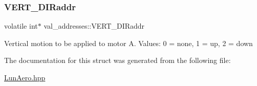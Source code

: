 \subsubsection{\texorpdfstring{V\+E\+R\+T\+\_\+\+D\+I\+Raddr}{VERT\_DIRaddr}}
{\footnotesize\ttfamily volatile int$\ast$ val\+\_\+addresses\+::\+V\+E\+R\+T\+\_\+\+D\+I\+Raddr}

Vertical motion to be applied to motor A. Values\+: 0 = none, 1 = up, 2 = down 

The documentation for this struct was generated from the following file\+:\begin{DoxyCompactItemize}
\item 
\hyperlink{LunAero_8hpp}{Lun\+Aero.\+hpp}\end{DoxyCompactItemize}
